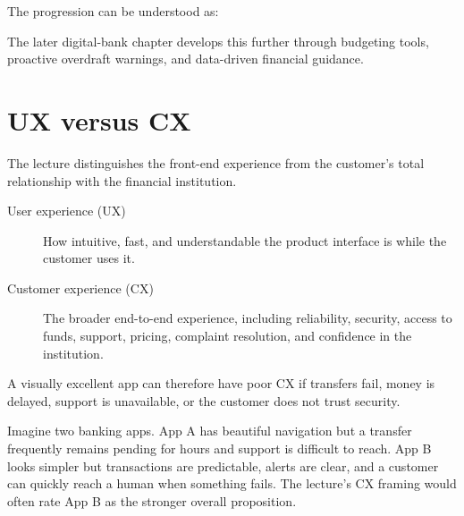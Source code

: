 The progression can be understood as:

\begin{mlfigure}
\end{mlfigure}

The later digital-bank chapter develops this further through budgeting tools, proactive overdraft warnings, and data-driven financial guidance.

\section{UX versus CX}

The lecture distinguishes the front-end experience from the customer's total relationship with the financial institution.

\begin{description}
  \item[User experience (UX)] How intuitive, fast, and understandable the product interface is while the customer uses it.
  \item[Customer experience (CX)] The broader end-to-end experience, including reliability, security, access to funds, support, pricing, complaint resolution, and confidence in the institution.
\end{description}

A visually excellent app can therefore have poor CX if transfers fail, money is delayed, support is unavailable, or the customer does not trust security.

\begin{workedexample}
Imagine two banking apps. App A has beautiful navigation but a transfer frequently remains pending for hours and support is difficult to reach. App B looks simpler but transactions are predictable, alerts are clear, and a customer can quickly reach a human when something fails. The lecture's CX framing would often rate App B as the stronger overall proposition.
\end{workedexample}

